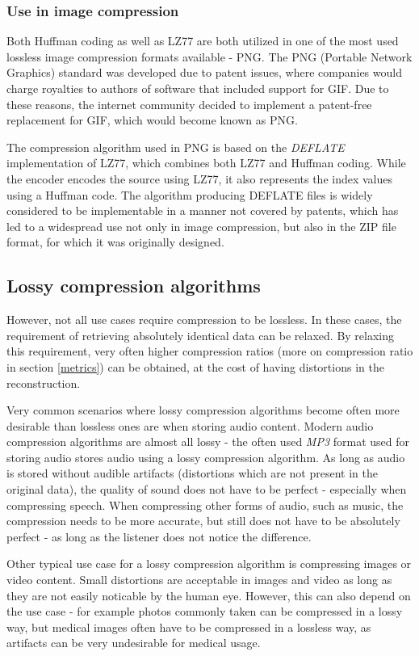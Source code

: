 \documentclass[thesis=M,english]{FITthesis}[2012/10/20]
\begin{document}
\subsubsection{Use in image compression}
Both Huffman coding as well as LZ77 are both utilized in one of the most
used lossless image compression formats available - PNG. The PNG (Portable
Network Graphics) standard was developed due to patent issues, where
companies would charge royalties to authors of software that included
support for GIF. Due to these reasons, the internet community decided to
implement a patent-free replacement for GIF, which would become known as PNG.\cite{png}

The compression algorithm used in PNG is based on the \emph{DEFLATE}
implementation of LZ77, which combines both LZ77 and Huffman coding. While the encoder
encodes the source using LZ77, it also represents the index values using a Huffman code.
The algorithm producing DEFLATE files is widely considered to be implementable in a manner
not covered by patents, which has led to a widespread use not only in image compression,
but also in the ZIP file format, for which it was originally designed.\cite{deflate}

\subsection{Lossy compression algorithms}
However, not all use cases require compression to be lossless. In
these cases, the requirement of retrieving absolutely identical data can
be relaxed. By relaxing this requirement, very often higher compression
ratios (more on compression ratio in section \ref{metrics}) can be obtained,
at the cost of having distortions in the reconstruction.

Very common scenarios where lossy compression algorithms become often more
desirable than lossless ones are when storing audio content. Modern audio
compression algorithms are almost all lossy - the often used \emph{MP3}
format used for storing audio stores audio using a lossy compression
algorithm. As long as audio is stored without audible artifacts (distortions
which are not present in the original data), the quality of sound does not
have to be perfect - especially when compressing speech. When compressing
other forms of audio, such as music, the compression needs to be more accurate,
but still does not have to be absolutely perfect - as long as the listener
does not notice the difference.

Other typical use case for a lossy compression algorithm is compressing images
or video content. Small distortions are acceptable in images and video as long
as they are not easily noticable by the human eye. However, this can also depend
on the use case - for example photos commonly taken can be compressed in a lossy
way, but medical images often have to be compressed in a lossless way, as artifacts
can be very undesirable for medical usage.
\end{document}
